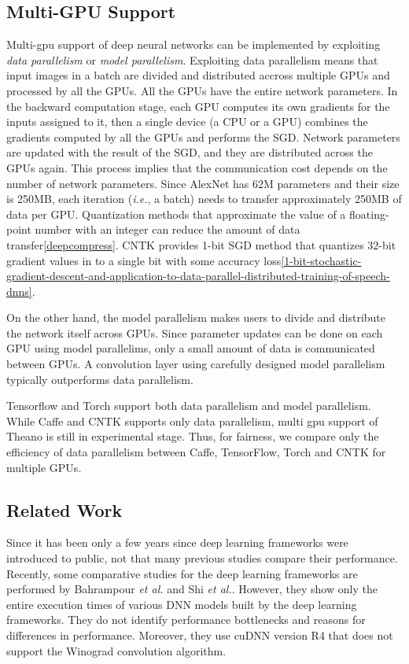 \subsection{Multi-GPU Support}
\label{sec:multiGPU-parallelism}
Multi-gpu support of deep neural networks can be implemented by exploiting \textit{data parallelism} or \textit{model parallelism}\cite{NIPS2012_4687}. Exploiting data parallelism means that input images in a batch are divided and distributed accross multiple GPUs and processed by all the GPUs. All the GPUs have the entire network parameters. In the backward computation stage, each GPU computes its own gradients for the inputs assigned to it, then a single device (a CPU or a GPU) combines the gradients computed by all the GPUs and performs the SGD. Network parameters are updated with the result of the SGD, and they are distributed across the GPUs again. This process implies that the communication cost depends on the number of network parameters. Since AlexNet has 62M parameters and their size is 250MB, each iteration (\textit{i.e.}, a batch) needs to transfer approximately 250MB of data per GPU. Quantization methods that approximate the value of a floating-point number with an integer can reduce the amount of data transfer\ref{deepcompress}. CNTK provides 1-bit SGD method that quantizes 32-bit gradient values in to a single bit with some accuracy loss\ref{1-bit-stochastic-gradient-descent-and-application-to-data-parallel-distributed-training-of-speech-dnns}.

On the other hand, the model parallelism makes users to divide and distribute the network itself across GPUs. Since parameter updates can be done on each GPU using model parallelims, only a small amount of data is communicated between GPUs. A convolution layer using carefully designed model parallelism typically outperforms data parallelism\cite{DBLP:journals/corr/YadanATR13}.

Tensorflow and Torch support both data parallelism and model parallelism. While Caffe and CNTK supports only data parallelism, multi gpu support of Theano is still in experimental stage. Thus, for fairness, we compare only the efficiency of data parallelism between Caffe, TensorFlow, Torch and CNTK for multiple GPUs. 

\subsection{Related Work}
Since it has been only a few years since deep learning frameworks were introduced to public, not that many previous studies compare their performance. Recently, some comparative studies for the deep learning frameworks are performed by Bahrampour \textit{et al.}\cite{DBLP:journals/corr/BahrampourRSS15} and Shi \textit{et al.}\cite{DBLP:journals/corr/ShiWXC16}. However, they show only the entire execution times of various DNN models built by the deep learning frameworks. They do not identify performance bottlenecks and reasons for differences in performance. Moreover, they use cuDNN version R4 that does not support the Winograd convolution algorithm.

